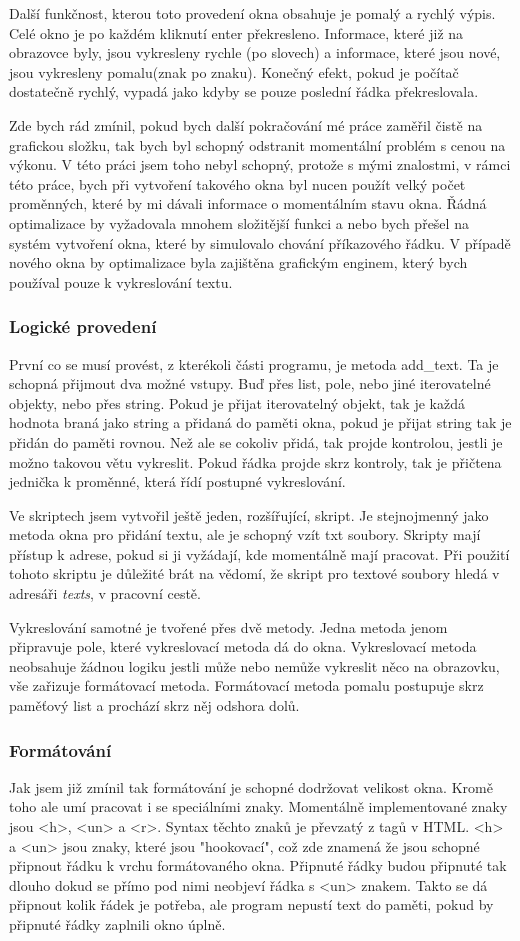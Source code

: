 \documentclass[12pt,a4paper]{article}
\begin{document}
Další funkčnost, kterou toto provedení okna obsahuje je pomalý a rychlý výpis. Celé okno je po každém kliknutí enter překresleno. Informace, které již na obrazovce byly, jsou vykresleny rychle (po slovech) a informace, které jsou nové, jsou vykresleny pomalu(znak po znaku). Konečný efekt, pokud je počítač dostatečně rychlý, vypadá jako kdyby se pouze poslední řádka překreslovala. 

Zde bych rád zmínil, pokud bych další pokračování mé práce zaměřil čistě na grafickou složku, tak bych byl schopný odstranit momentální problém s cenou na výkonu. V této práci jsem toho nebyl schopný, protože s mými znalostmi, v rámci této práce, bych při vytvoření takového okna byl nucen použít velký počet proměnných, které by mi dávali informace o momentálním stavu okna. Řádná optimalizace by vyžadovala mnohem složitější funkci a nebo bych přešel na systém vytvoření okna, které by simulovalo chování příkazového řádku. V případě nového okna by optimalizace byla zajištěna grafickým enginem, který bych používal pouze k vykreslování textu.
\subsubsection{Logické provedení}
První co se musí provést, z kterékoli části programu, je metoda add\_text. Ta je schopná přijmout dva možné vstupy. Buď přes list, pole, nebo jiné iterovatelné objekty, nebo přes string. Pokud je přijat iterovatelný objekt, tak je každá hodnota braná jako string a přidaná do paměti okna, pokud je přijat string tak je přidán do paměti rovnou. Než ale se cokoliv přidá, tak projde kontrolou, jestli je možno takovou větu vykreslit. Pokud řádka projde skrz kontroly, tak je přičtena jednička k proměnné, která řídí postupné vykreslování.

Ve skriptech jsem vytvořil ještě jeden, rozšířující, skript. Je stejnojmenný jako metoda okna pro přidání textu, ale je schopný vzít txt soubory. Skripty mají přístup k adrese, pokud si ji vyžádají, kde momentálně mají pracovat. Při použití tohoto skriptu je důležité brát na vědomí, že skript pro textové soubory hledá v adresáři \textit{texts}, v pracovní cestě.

Vykreslování samotné je tvořené přes dvě metody. Jedna metoda jenom připravuje pole, které vykreslovací metoda dá do okna. Vykreslovací metoda neobsahuje žádnou logiku jestli může nebo nemůže vykreslit něco na obrazovku, vše zařizuje formátovací metoda.
Formátovací metoda pomalu postupuje skrz paměťový list a prochází skrz něj odshora dolů.
\subsubsection{Formátování}
Jak jsem již zmínil tak formátování je schopné dodržovat velikost okna. Kromě toho ale umí pracovat i se speciálními znaky. Momentálně implementované znaky jsou <h>, <un> a <r>. Syntax těchto znaků je převzatý z tagů v HTML. <h> a <un> jsou znaky, které jsou "hookovací", což zde znamená že jsou schopné připnout řádku k vrchu formátovaného okna. Připnuté řádky budou připnuté tak dlouho dokud se přímo pod nimi neobjeví řádka s <un> znakem. Takto se dá připnout kolik řádek je potřeba, ale program nepustí text do paměti, pokud by připnuté řádky zaplnili okno úplně. 
\end{document}
